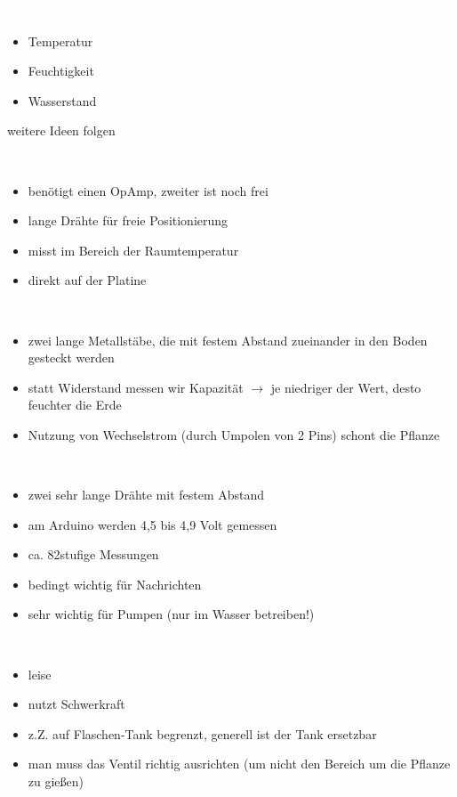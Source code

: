 \documentclass[bigger]{beamer}
\newcommand{\topic}[1]{{\huge{\textcolor{white}{\textbf{#1}}}}}
\begin{document}
\begin{frame}{\topic{Sensoren}}
	\begin{itemize}
		\item Temperatur
		\item Feuchtigkeit
		\item Wasserstand
	\end{itemize}
weitere Ideen folgen
\end{frame}

\begin{frame}{\topic{Temperatur}}
	\begin{itemize}
		\item benötigt einen OpAmp, zweiter ist noch frei
		\item lange Drähte für freie Positionierung
		\item misst im Bereich der Raumtemperatur
		\item direkt auf der Platine
	\end{itemize}
\end{frame}

\begin{frame}{\topic{Feuchtigkeit}}
	\begin{itemize}
		\item zwei lange Metallstäbe, die mit festem Abstand zueinander in den Boden gesteckt werden
		\item statt Widerstand messen wir Kapazität $\rightarrow$ je niedriger der Wert, desto feuchter die Erde
		\item Nutzung von Wechselstrom (durch Umpolen von 2 Pins) schont die Pflanze
	\end{itemize}
\end{frame}

\begin{frame}{\topic{Wasserstand}}
	\begin{itemize}
		\item zwei sehr lange Drähte mit festem Abstand
		\item am Arduino werden 4,5 bis 4,9 Volt gemessen
		\item ca. 82stufige Messungen
		\item bedingt wichtig für Nachrichten
		\item sehr wichtig für Pumpen (nur im Wasser betreiben!)
	\end{itemize}
\end{frame}

\begin{frame}{\topic{Aktuatoren/Ventil}}
	\begin{itemize}
		\item leise
		\item nutzt Schwerkraft
		\item z.Z. auf Flaschen-Tank begrenzt, generell ist der Tank ersetzbar
		\item man muss das Ventil richtig ausrichten (um nicht den Bereich um die Pflanze zu gießen)
	\end{itemize}
\end{frame}
\end{document}
